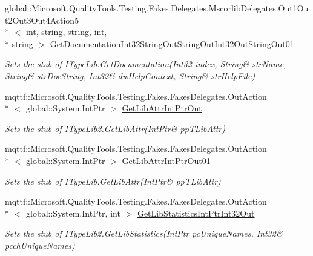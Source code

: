 \begin{DoxyCompactItemize}
global\-::\-Microsoft.\-Quality\-Tools.\-Testing.\-Fakes.\-Delegates.\-Mscorlib\-Delegates.\-Out1\-Out2\-Out3\-Out4\-Action5\\*
$<$ int, string, string, int, \\*
string $>$ \hyperlink{class_system_1_1_runtime_1_1_interop_services_1_1_com_types_1_1_fakes_1_1_stub_i_type_lib2_a48da2e5684075d66488e9fd653ac1f00}{Get\-Documentation\-Int32\-String\-Out\-String\-Out\-Int32\-Out\-String\-Out01}
\begin{DoxyCompactList}\small\item\em Sets the stub of I\-Type\-Lib.\-Get\-Documentation(Int32 index, String\& str\-Name, String\& str\-Doc\-String, Int32\& dw\-Help\-Context, String\& str\-Help\-File)\end{DoxyCompactList}\item 
mqttf\-::\-Microsoft.\-Quality\-Tools.\-Testing.\-Fakes.\-Fakes\-Delegates.\-Out\-Action\\*
$<$ global\-::\-System.\-Int\-Ptr $>$ \hyperlink{class_system_1_1_runtime_1_1_interop_services_1_1_com_types_1_1_fakes_1_1_stub_i_type_lib2_ae454fd215401519c4d75246ae345860b}{Get\-Lib\-Attr\-Int\-Ptr\-Out}
\begin{DoxyCompactList}\small\item\em Sets the stub of I\-Type\-Lib2.\-Get\-Lib\-Attr(Int\-Ptr\& pp\-T\-Lib\-Attr)\end{DoxyCompactList}\item 
mqttf\-::\-Microsoft.\-Quality\-Tools.\-Testing.\-Fakes.\-Fakes\-Delegates.\-Out\-Action\\*
$<$ global\-::\-System.\-Int\-Ptr $>$ \hyperlink{class_system_1_1_runtime_1_1_interop_services_1_1_com_types_1_1_fakes_1_1_stub_i_type_lib2_aae81e4fc1d620b20720fa9ca284ffc1e}{Get\-Lib\-Attr\-Int\-Ptr\-Out01}
\begin{DoxyCompactList}\small\item\em Sets the stub of I\-Type\-Lib.\-Get\-Lib\-Attr(Int\-Ptr\& pp\-T\-Lib\-Attr)\end{DoxyCompactList}\item 
mqttf\-::\-Microsoft.\-Quality\-Tools.\-Testing.\-Fakes.\-Fakes\-Delegates.\-Out\-Action\\*
$<$ global\-::\-System.\-Int\-Ptr, int $>$ \hyperlink{class_system_1_1_runtime_1_1_interop_services_1_1_com_types_1_1_fakes_1_1_stub_i_type_lib2_a6bbf4d11dc71edb769b78efe8b640dd6}{Get\-Lib\-Statistics\-Int\-Ptr\-Int32\-Out}
\begin{DoxyCompactList}\small\item\em Sets the stub of I\-Type\-Lib2.\-Get\-Lib\-Statistics(Int\-Ptr pc\-Unique\-Names, Int32\& pcch\-Unique\-Names)\end{DoxyCompactList}\item 

\end{DoxyCompactItemize}
